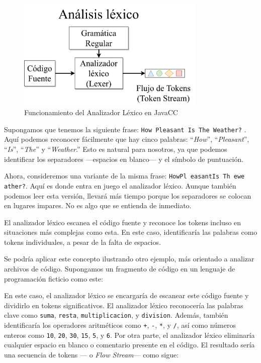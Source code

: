 

\begin{figure}[H]
	\centering
	\includegraphics[width=0.8\textwidth]{imagenes/analizadorlexico.png}
	\caption{Funcionamiento del Analizador Léxico en JavaCC\cite{ytanalizadorlexico}}
	\label{fig:analizadorlexico}
\end{figure}

Supongamos que tenemos la siguiente frase: \lstinline|How Pleasant Is The Weather?| . Aquí podemos reconocer fácilmente que hay cinco palabras: “\textit{How}”, “\textit{Pleasant}”, “\textit{Is}”, “\textit{The}” y “\textit{Weather}.” Esto es natural para nosotros, ya que podemos identificar los separadores ---espacios en blanco--- y el símbolo de puntuación.

Ahora, consideremos una variante de la misma frase: \lstinline|HowPl easantIs Th ewe ather?|. Aquí es donde entra en juego el analizador léxico. Aunque también podemos leer esta versión, llevará más tiempo porque los separadores se colocan en lugares impares. No es algo que se entienda de inmediato.

El analizador léxico escanea el código fuente y reconoce los tokens incluso en situaciones más complejas como esta. En este caso, identificaría las palabras como tokens individuales, a pesar de la falta de espacios.

Se podría aplicar este concepto ilustrando otro ejemplo, más orientado a analizar archivos de código. Supongamos un fragmento de código en un lenguaje de programación ficticio como este:

\lstset{inputencoding=utf8/latin1}


En este caso, el analizador léxico se encargaría de escanear este código fuente y dividirlo en tokens significativos. El analizador léxico reconocería las palabras clave como \lstinline|suma|, \lstinline|resta|, \lstinline|multiplicacion|, y \lstinline|division|. Además, también identificaría los operadores aritméticos como \lstinline|+|, \lstinline|-|,  \lstinline|*|, y  \lstinline|/|, así como números enteros como  \lstinline|10|,  \lstinline|20|,  \lstinline|30|,  \lstinline|15|,  \lstinline|5|, y \lstinline|6|. Por otra parte, el analizador léxico eliminaría cualquier espacio en blanco o comentario presente en el código. El resultado sería una secuencia de tokens --- o \textit{Flow Stream}--- como sigue:


